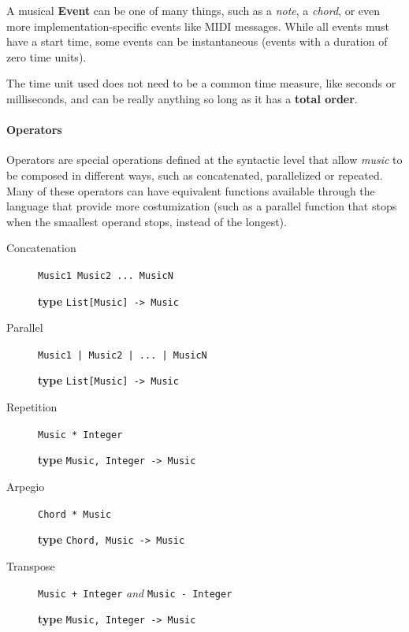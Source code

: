 \documentclass[a4paper,UKenglish,cleveref, autoref]{oasics-v2019}
\begin{document}
A musical \textbf{Event} can be one of many things, such as a \textit{note}, a \textit{chord}, or even more implementation-specific events like MIDI messages. While all events must have a start time, some events can be instantaneous (events with a duration of zero time units).



The time unit used does not need to be a common time measure, like seconds or milliseconds, and can be really anything so long as it has a \textbf{total order}.

\paragraph*{Operators}
Operators are special operations defined at the syntactic level that allow \textit{music} to be composed in different ways, such as concatenated, parallelized or repeated. Many of these operators can have equivalent functions available through the language that provide more costumization (such as a parallel function that stops when the smaallest operand stops, instead of the longest).

\begin{description}
    \item[Concatenation] \verb|Music1 Music2 ... MusicN|
    
        \textbf{type} \verb|List[Music] -> Music|
    \item[Parallel] \verb'Music1 | Music2 | ... | MusicN'
        
        \textbf{type} \verb|List[Music] -> Music|
    \item[Repetition] \verb'Music * Integer'
    
        \textbf{type} \verb|Music, Integer -> Music|
    \item[Arpegio] \verb'Chord * Music'
        
        \textbf{type} \verb|Chord, Music -> Music|
    \item[Transpose] \verb'Music + Integer' \textit{and} \verb'Music - Integer'
    
        \textbf{type} \verb|Music, Integer -> Music|
\end{description}
\end{document}
